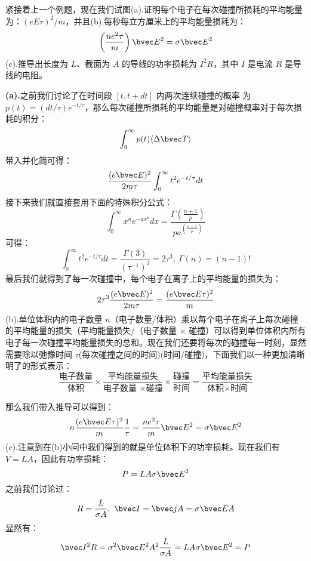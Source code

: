\begin{exercise}{}
紧接着上一个例题，现在我们试图(a).证明每个电子在每次碰撞所损耗的平均能量为：$(eE\tau)^2/m$，并且(b).每秒每立方厘米上的平均能量损耗为：
\begin{equation}
\left(\frac{ne^2\tau}{m}\right)\bvec E^2=\sigma \bvec E^2
\end{equation}
(c).推导出长度为 $L$、截面为 $A$ 的导线的功率损耗为 $I^2R$，其中 $I$ 是电流 $R$ 是导线的电阻。

\textbf{(a).}之前我们讨论了在时间段 $[t, t + dt]$ 内两次连续碰撞的概率
为 $p(t)=(dt/\tau)e^{- t/\tau}$，那么每次碰撞所损耗的平均能量是对碰撞概率对于每次损耗的积分：
\begin{equation}
\int_0^\infty p(t) \langle\Delta\bvec T\rangle
\end{equation}
带入并化简可得：
\begin{equation}
\frac{(e\bvec E)^2}{2m\tau}\int_0^\infty t^2 e^{- t/\tau}dt
\end{equation}
接下来我们就直接套用下面的特殊积分公式：
\begin{equation}
\int_0^\infty x^n e^{-ax^p}dx = \frac{\Gamma\left(\frac{n+1}{p}\right)}{pa^{\left(\frac{n+1}{p}\right)}}
\end{equation}
可得：
\begin{equation}
\int_0^\infty t^2 e^{- t/\tau}dt=\frac{\Gamma(3)}{(\tau^{-1})^3}=2\tau^3;\ \Gamma(n)=(n-1)!
\end{equation}
最后我们就得到了每一次碰撞中，每个电子在离子上的平均能量的损失为：
\begin{equation}
2\tau^3\frac{(e\bvec E)^2}{2m\tau}=\frac{(e\bvec E\tau)^2}{m}
\end{equation}
(b).单位体积内的电子数量 $n$（电子数量/体积）乘以每个电子在离子上每次碰撞的平均能量的损失（平均能量损失/（电子数量 $\times$ 碰撞）可以得到单位体积内所有电子每一次碰撞平均能量损失的总和。现在我们还要将每次的碰撞每一时刻，显然需要除以弛豫时间 $\tau$(每次碰撞之间的时间)(时间/碰撞)，下面我们以一种更加清晰明了的形式表示：
\begin{equation}
\frac{\text{电子数量}}{\text{体积}}\times \frac{\text{平均能量损失}}{\text{电子数量 }\times \text{碰撞}}\times\frac{\text{碰撞}}{\text{时间}}=\frac{\text{平均能量损失}}{\text{体积}\times \text{时间}}
\end{equation}

那么我们带入推导可以得到：
\begin{equation}
n \frac{(e\bvec E\tau)^2}{m} \frac{1}{\tau} = \frac{ne^2\tau}{m}\bvec E^2 = \sigma \bvec E^2
\end{equation}
(c).注意到在(b)小问中我们得到的就是单位体积下的功率损耗。现在我们有 $V=LA$，因此有功率损耗：
\begin{equation}
P = LA\sigma \bvec E^2
\end{equation}
之前我们讨论过：
\begin{equation}
R = \frac{L}{\sigma A},\ \bvec I = \bvec j A=\sigma\bvec E A
\end{equation}
显然有：
\begin{equation}
\bvec I^2 R=\sigma^2\bvec E^2 A^2 \frac{L}{\sigma A} = LA\sigma \bvec E^2 = P
\end{equation}
\end{exercise}




